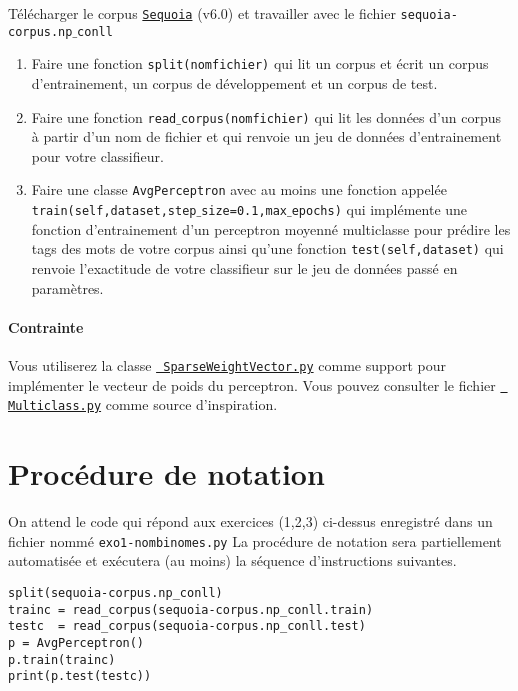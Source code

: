 \documentclass[a4paper,12pts]{article}
\begin{document}
Télécharger le corpus
\href{https://gforge.inria.fr/frs/?group_id=3597}{\tt Sequoia} (v6.0) et travailler avec le fichier {\tt sequoia-corpus.np$\_$conll}
\begin{enumerate}
\item Faire une fonction {\tt split(nomfichier)} qui lit un corpus et
  écrit un corpus d'entrainement, un corpus de développement et un
  corpus de test.
\item Faire une fonction {\tt read$\_$corpus(nomfichier)} qui lit les données d'un
  corpus à partir d'un nom de fichier et qui renvoie un jeu de données
  d'entrainement pour votre classifieur.
\item  Faire une classe {\tt AvgPerceptron}
avec au moins une fonction appelée\\ {\tt train(self,dataset,step$\_$size=0.1,max$\_$epochs)}
qui implémente une
fonction d'entrainement d'un perceptron moyenné multiclasse pour
prédire les tags des mots de votre corpus ainsi qu'une fonction
{\tt test(self,dataset)} qui renvoie l'exactitude de votre classifieur sur
le jeu de données passé en paramètres.
\end{enumerate}
\paragraph{Contrainte} Vous utiliserez la classe
\href{https://github.com/bencrabbe/parsing-at-diderot/blob/master/SparseWeightVector.py}{\tt
  SparseWeightVector.py} comme support pour implémenter le vecteur de
poids du perceptron. Vous pouvez consulter le fichier 
\href{https://github.com/bencrabbe/parsing-at-diderot/blob/master/Multiclass.py}{\tt
  Multiclass.py} comme source d'inspiration.



\section{Procédure de notation}
On attend le code qui répond aux exercices (1,2,3) ci-dessus
enregistré dans un fichier nommé {\tt exo1-nombinomes.py} 
La procédure de notation sera partiellement automatisée et exécutera (au moins) la séquence d'instructions suivantes.
\begin{verbatim}
split(sequoia-corpus.np_conll)
trainc = read_corpus(sequoia-corpus.np_conll.train)
testc  = read_corpus(sequoia-corpus.np_conll.test)
p = AvgPerceptron()
p.train(trainc)
print(p.test(testc))
\end{verbatim}
\end{document}
